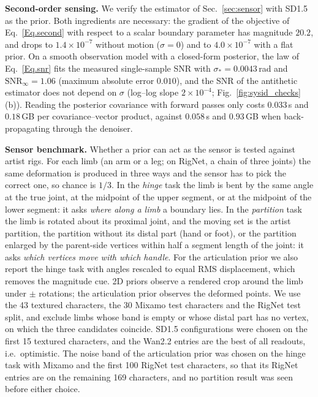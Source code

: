 \documentclass[lettersize,journal]{IEEEtran}
\newenvironment{revblock}{\par\color{red}}{\par}
\begin{document}
\begin{revblock}
\textbf{Second-order sensing.} We verify the estimator of Sec.~\ref{sec:sensor} with SD1.5
\cite{rombach2022high} as the prior. Both ingredients are necessary: the gradient of the
objective of Eq.~\ref{Eq.second} with respect to a scalar boundary parameter has magnitude
$20.2$, and drops to $1.4\times10^{-7}$ without motion ($\sigma=0$) and to $4.0\times10^{-7}$
with a flat prior. On a smooth observation model with a closed-form posterior, the law of
Eq.~\ref{Eq.snr} fits the measured single-sample SNR with $\sigma_{\ast}=0.0043$\,rad and
$\mathrm{SNR}_{\infty}=1.06$ (maximum absolute error $0.010$), and the SNR of the antithetic
estimator does not depend on $\sigma$ (log--log slope $2\times10^{-4}$; Fig.~\ref{fig:sysid_checks}(b)). Reading the posterior
covariance with forward passes only costs $0.033$\,s and $0.18$\,GB per covariance--vector
product, against $0.058$\,s and $0.93$\,GB when back-propagating through the denoiser.

\textbf{Sensor benchmark.} Whether a prior can act as the sensor is tested against artist rigs.
For each limb (an arm or a leg; on RigNet, a chain of three joints) the same deformation is
produced in three ways and the sensor has to pick the correct one, so chance is $1/3$. In the
\textit{hinge} task the limb is bent by the same angle at the true joint, at the midpoint of the
upper segment, or at the midpoint of the lower segment: it asks \textit{where along a limb} a
boundary lies. In the \textit{partition} task the limb is rotated about its proximal joint, and
the moving set is the artist partition, the partition without its distal part (hand or foot),
or the partition enlarged by the parent-side vertices within half a segment length of the
joint: it asks \textit{which vertices move with which handle}. For the articulation prior we also
report the hinge task with angles rescaled to equal RMS displacement, which removes the
magnitude cue. 2D priors observe a rendered crop around the limb under $\pm$ rotations; the
articulation prior observes the deformed points. We use the 43 textured characters, the 30
Mixamo test characters and the RigNet test split, and exclude limbs whose band is empty or whose
distal part has no vertex, on which the three candidates coincide. SD1.5 configurations were
chosen on the first 15 textured characters, and the Wan2.2 entries are the best of all readouts,
i.e.\ optimistic. The noise band of the articulation prior was chosen on the
hinge task with Mixamo and the first 100 RigNet test characters, so that its RigNet entries
are on the remaining 169 characters, and no partition result was seen before either choice.


\end{revblock}
\end{document}
